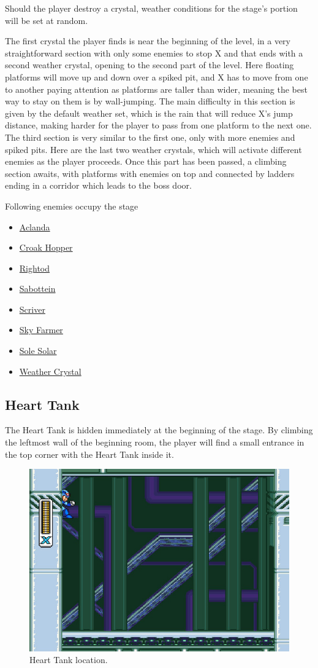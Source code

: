 Should the player destroy a crystal, weather conditions for the stage's portion will be set at random.

The first crystal the player finds is near the beginning of the level, in a very straightforward section with only some enemies to stop X and that ends with a second weather crystal, opening to the second part of the level. Here floating platforms will move up and down over a spiked pit, and X has to move from one to another paying attention as platforms are taller than wider, meaning the best way to stay on them is by wall-jumping. The main difficulty in this section is given by the default weather set, which is the rain that will reduce X's jump distance, making harder for the player to pass from one platform to the next one. The third section is very similar to the first one, only with more enemies and spiked pits. Here are the last two weather crystals, which will activate different enemies as the player proceeds. Once this part has been passed, a climbing section awaits, with platforms with enemies on top and connected by ladders ending in a corridor which leads to the boss door.

Following enemies occupy the stage~\cite{wiki:weather_control}
\begin{itemize}
	\item \hyperlink{enem:Aclanda}{Aclanda}
	\item \hyperlink{enem:Croak_hopper}{Croak Hopper}
	\item \hyperlink{enem:Rightod}{Rightod}
	\item \hyperlink{enem:Sabottein}{Sabottein}
	\item \hyperlink{enem:Scriver}{Scriver}
	\item \hyperlink{enem:Sky_farmer}{Sky Farmer}
	\item \hyperlink{enem:Sole_solar}{Sole Solar}
	\item \hyperlink{enem:Weather_crystal}{Weather Crystal}
\end{itemize}

\subsection{Heart Tank}
The Heart Tank is hidden immediately at the beginning of the stage. By climbing the leftmost wall of the beginning room, the player will find a small entrance in the top corner with the Heart Tank inside it.
\begin{figure}[htp]
	\centering
	\includegraphics[width=0.5\linewidth]{figures/X2/Wire_sponge/Sponge_heart.jpg}
	\caption{Heart Tank location.}
\end{figure}

